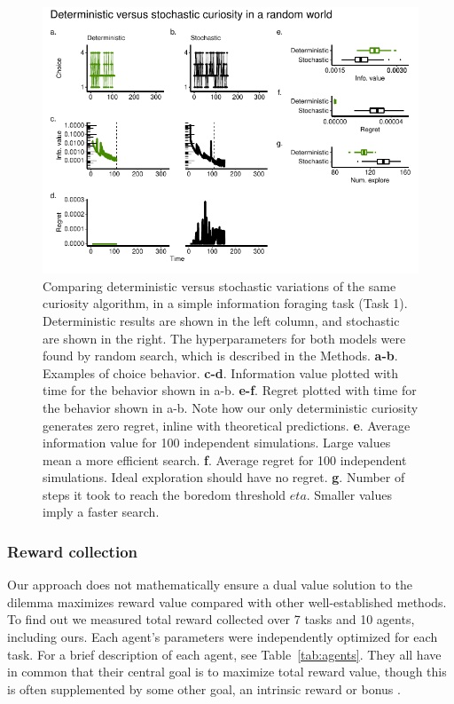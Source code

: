 \begin{figure}
	\begin{fullwidth}
	\includegraphics[width=1.0\linewidth]{img/curiosity1.pdf} 
	\caption{Comparing deterministic versus stochastic variations of the same curiosity algorithm, in a simple information foraging task (Task 1). Deterministic results are shown in the left column, and stochastic are shown in the right. The hyperparameters for both models were found by random search, which is described in the Methods.
	\textbf{a-b}. Examples of choice behavior.
	\textbf{c-d}. Information value plotted with time for the behavior shown in a-b.
	\textbf{e-f}. Regret plotted with time for the behavior shown in a-b. Note how our only deterministic curiosity generates zero regret, inline with theoretical predictions.
	\textbf{e}. Average information value for 100 independent simulations. Large values mean a more efficient search.
	\textbf{f}. Average regret for 100 independent simulations. Ideal exploration should have no regret. 
	\textbf{g}. Number of steps it took to reach the boredom threshold $eta$. Smaller values imply a faster search.
	}
	\label{fig:curiosity1} 
	\end{fullwidth}
\end{figure}


\subsubsection*{Reward collection} 
Our approach does not mathematically ensure a dual value solution to the dilemma maximizes reward value compared with other well-established methods. To find out we measured total reward collected over 7 tasks and 10 agents, including ours. Each agent's parameters were independently optimized for each task. For a brief description of each agent, see Table~\ref{tab:agents}. They all have in common that their central goal is to maximize total reward value, though this is often supplemented by some other goal, an intrinsic reward or bonus \cite{Ng1999,Sutton1998}. 

